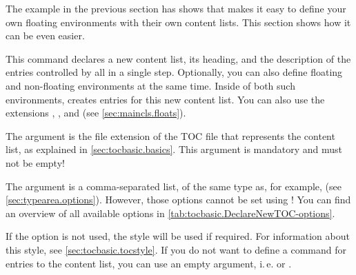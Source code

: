 The example in the previous section has shows that  makes it
easy to define your own floating environments with their own content lists.
This section shows how it can be even easier.

\begin{Declaration}
\end{Declaration}
This command declares a new content list,
its heading, and the description of the entries controlled by
 all in a single step. Optionally, you can also define
floating and non-floating environments at the same time. Inside of both such
environments, %
 creates entries
for this new content list. You can also use the \KOMAScript{} extensions
, , and
 (see \autoref{sec:maincls.floats}).

The  argument is the file extension of the TOC file that
represents the content list, as explained in  \autoref{sec:tocbasic.basics}.
This argument is mandatory and must not be empty!

The  argument is a comma-separated list, of the same type as,
for example,  (see
\autoref{sec:typearea.options}). However, those options
cannot be set using !
You can find an overview of all available options in
\autoref{tab:tocbasic.DeclareNewTOC-options}.

If the 
option is not used, the  style will be used if required. For
information about this style, see \autoref{sec:tocbasic.tocstyle}. If you do
not want to define a command for entries to the content list, you can use an
empty argument, i.\,e.  or
.

